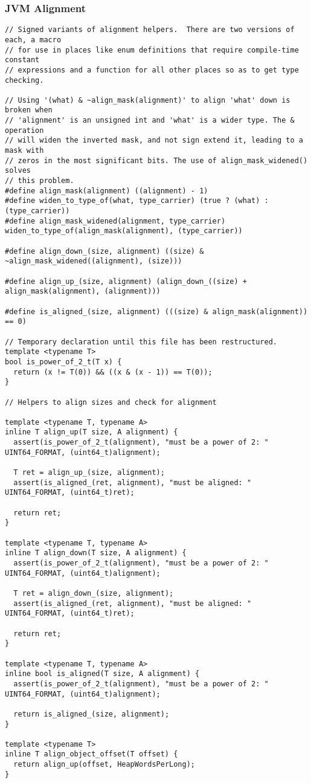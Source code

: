 \subsubsection{JVM Alignment}

\begin{verbatim}
// Signed variants of alignment helpers.  There are two versions of each, a macro
// for use in places like enum definitions that require compile-time constant
// expressions and a function for all other places so as to get type checking.

// Using '(what) & ~align_mask(alignment)' to align 'what' down is broken when
// 'alignment' is an unsigned int and 'what' is a wider type. The & operation
// will widen the inverted mask, and not sign extend it, leading to a mask with
// zeros in the most significant bits. The use of align_mask_widened() solves
// this problem.
#define align_mask(alignment) ((alignment) - 1)
#define widen_to_type_of(what, type_carrier) (true ? (what) : (type_carrier))
#define align_mask_widened(alignment, type_carrier) widen_to_type_of(align_mask(alignment), (type_carrier))

#define align_down_(size, alignment) ((size) & ~align_mask_widened((alignment), (size)))

#define align_up_(size, alignment) (align_down_((size) + align_mask(alignment), (alignment)))

#define is_aligned_(size, alignment) (((size) & align_mask(alignment)) == 0)

// Temporary declaration until this file has been restructured.
template <typename T>
bool is_power_of_2_t(T x) {
  return (x != T(0)) && ((x & (x - 1)) == T(0));
}

// Helpers to align sizes and check for alignment

template <typename T, typename A>
inline T align_up(T size, A alignment) {
  assert(is_power_of_2_t(alignment), "must be a power of 2: " UINT64_FORMAT, (uint64_t)alignment);

  T ret = align_up_(size, alignment);
  assert(is_aligned_(ret, alignment), "must be aligned: " UINT64_FORMAT, (uint64_t)ret);

  return ret;
}

template <typename T, typename A>
inline T align_down(T size, A alignment) {
  assert(is_power_of_2_t(alignment), "must be a power of 2: " UINT64_FORMAT, (uint64_t)alignment);

  T ret = align_down_(size, alignment);
  assert(is_aligned_(ret, alignment), "must be aligned: " UINT64_FORMAT, (uint64_t)ret);

  return ret;
}

template <typename T, typename A>
inline bool is_aligned(T size, A alignment) {
  assert(is_power_of_2_t(alignment), "must be a power of 2: " UINT64_FORMAT, (uint64_t)alignment);

  return is_aligned_(size, alignment);
}
    
template <typename T>
inline T align_object_offset(T offset) {
  return align_up(offset, HeapWordsPerLong);
}
\end{verbatim}